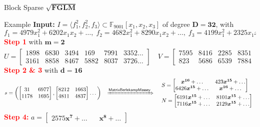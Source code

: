 \documentclass[final]{beamer}
\newlength{\twocolwid}
\begin{document}
\begin{frame}[t]
\begin{columns}[t]
\begin{column}{\twocolwid}
\begin{block}{Block Sparse $\mathbf{\sqrt{FGLM}}$}
\end{block}
\begin{block}{Example}
		\textbf{Input: }$I = \langle f_1^2, f_2^2,f_3 \rangle \subset \mathbb{F}_{9001}[x_1,x_2,x_3]$
                of degree $\boldsymbol{D=32}$,
                with
		$$ f_1 = 4979x_1^2 + 6202x_1x_2 + \dots, \;
		   f_2 = 4682x_1^2 + 8290x_1x_2 + \dots, \;
		   f_3 = 4199x_1^2 + 2325x_1x_2 + \dots$$
		\textcolor{red}{\bf Step 1} with $\boldsymbol{m = 2}$
		$$ U = \begin{bmatrix}
		1898 &6830 &3494 & 169 &7991 &3352 \dots \\
		3161 &8858 &8467 &5882 &8037 &3726 \dots
		\end{bmatrix} \quad
		V = \begin{bmatrix}
		7595 &8416 &2285 &8351 & 550 &7012 \dots \\
		823 &5686 &6539 &7884 &7105 &3427 \dots 
		\end{bmatrix}^t
		$$
		\textcolor{red}{\bf Step 2 \& 3} with $\boldsymbol{d = 16}$
		$$ s = \left(
		\begin{bmatrix}
		31  & 6977\\
		1178& 1695
		\end{bmatrix},
		\begin{bmatrix}
		8212&1663\\
		4811&4837
		\end{bmatrix}
		\dots
		\right)\,
                ~~\xRightarrow{\mathsf{MatrixBerlekampMassey}}~~
                \begin{array}{l}
		S = \begin{bmatrix}
		\boldsymbol{x^{16}} + \dots & 423\boldsymbol{x^{15}} +\dots\\
		6426\boldsymbol{x^{15}}+ \dots & \boldsymbol{x^{16}} + \dots
		\end{bmatrix} \, \\[1em]
		N = \begin{bmatrix}
		6191\boldsymbol{x^{15}} + \dots & 8101\boldsymbol{x^{15}} + \dots\\
		7116\boldsymbol{x^{15}} + \dots & 2129\boldsymbol{x^{15}} + \dots
		\end{bmatrix}
                \end{array}
		$$
		\textcolor{red}{\bf Step 4:}
		$%
                a = \begin{bmatrix}
		2575\boldsymbol{x^7}+\dots ~~&~~ \boldsymbol{x^8} + \dots
		\end{bmatrix}$


\end{block}
\end{column}
\end{columns}
\end{frame}
\end{document}
